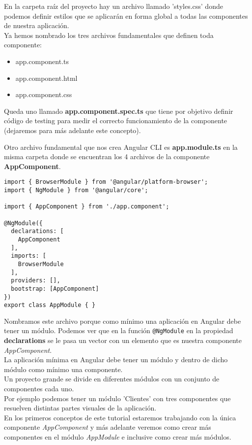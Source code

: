 \documentclass[12pt]{book} %
\begin{document}
En la carpeta raíz del proyecto hay un archivo llamado 'styles.css' donde podemos definir estilos que se aplicarán en forma global a todas las componentes de nuestra aplicación.\\

Ya hemos nombrado los tres archivos fundamentales que definen toda componente:
\begin{itemize}
\item app.component.ts
\item app.component.html
\item app.component.css
\end{itemize}
Queda uno llamado \textbf{app.component.spec.ts} que tiene por objetivo definir código de testing para medir el correcto funcionamiento de la componente (dejaremos para más adelante este concepto).

Otro archivo fundamental que nos crea Angular CLI es \textbf{app.module.ts} en la misma carpeta donde se encuentran los 4 archivos de la componente \textbf{AppComponent}.\\

\begin{verbatim}
import { BrowserModule } from '@angular/platform-browser';
import { NgModule } from '@angular/core';

import { AppComponent } from './app.component';

@NgModule({
  declarations: [
    AppComponent
  ],
  imports: [
    BrowserModule
  ],
  providers: [],
  bootstrap: [AppComponent]
})
export class AppModule { }
\end{verbatim}

Nombramos este archivo porque como mínimo una aplicación en Angular debe tener un módulo. Podemos ver que en la función \verb_@NgModule_ en la propiedad \textbf{declarations} se le pasa un vector con un elemento que es nuestra componente \emph{AppComponent}.\\

La aplicación mínima en Angular debe tener un módulo y dentro de dicho módulo como mínimo una componente.\\

Un proyecto grande se divide en diferentes módulos con un conjunto de componentes cada uno.\\

Por ejemplo podemos tener un módulo 'Clientes' con tres componentes que resuelven distintas partes visuales de la aplicación.\\

En los primeros conceptos de este tutorial estaremos trabajando con la única componente \emph{AppComponent} y más adelante veremos como crear más componentes en el módulo \emph{AppModule} e inclusive como crear más módulos.
\end{document}
